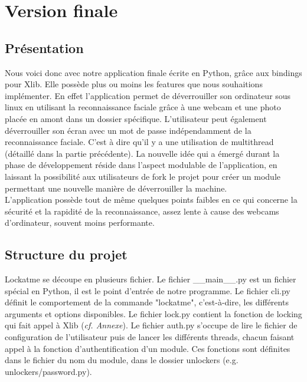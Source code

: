 \documentclass[french]{report}
\begin{document}
\chapter{Version finale}

\newpage

\section{Présentation}
Nous voici donc avec notre application finale écrite en Python, grâce aux bindings
pour Xlib. Elle possède plus ou moins les features que nous souhaitions
implémenter. En effet l'application permet de déverrouiller son ordinateur sous linux
en utilisant la reconnaissance faciale grâce à une webcam et une photo placée
en amont dans un dossier spécifique. L'utilisateur peut également déverrouiller
son écran avec un mot de passe indépendamment de la reconnaissance faciale. C'est
à dire qu'il y a une utilisation de multithread (détaillé dans la partie précédente).
La nouvelle idée qui a émergé durant la phase de développement réside dans
l'aspect modulable de l'application, en laissant la possibilité aux utilisateurs
de fork le projet pour créer un module permettant une nouvelle manière de
déverrouiller la machine.\\
L'application possède tout de même quelques points faibles en ce qui concerne la
sécurité et la rapidité de la reconnaissance, assez lente à cause des webcams
d'ordinateur, souvent moins performante.

\section{Structure du projet}
Lockatme se découpe en plusieurs fichier. Le fichier \_\_main\_\_.py est un fichier
spécial en Python, il est le point d'entrée de notre programme. Le fichier cli.py
définit le comportement de la commande "lockatme", c'est-à-dire, les différents
arguments et options disponibles.
Le fichier lock.py contient la fonction de locking qui fait appel à Xlib (\emph{cf. Annexe}).
Le fichier auth.py s'occupe de lire le fichier de configuration de l'utilisateur
puis de lancer les différents threads, chacun faisant appel à la fonction
d'authentification d'un module. Ces fonctions sont définites dans le
fichier du nom du module, dans le dossier unlockers (e.g. unlockers/password.py).
\end{document}
